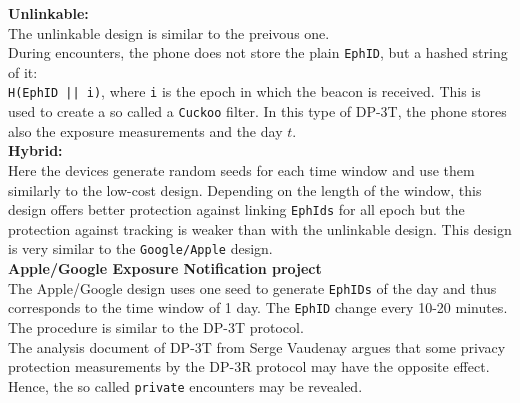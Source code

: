 \documentclass[a4paper, twocolumn]{article}
\begin{document}
\textbf{Unlinkable:}\\
The unlinkable design is similar to the preivous one.\\
During encounters, the phone does not store the plain \texttt{EphID}, but a hashed string of it:\\ \texttt{H(EphID || i)}, where \texttt{i} is the epoch in which the beacon is received. This is used to create a so called a \texttt{Cuckoo} filter. In this type of DP-3T, the phone stores also the exposure measurements and the day $t$.\\
\textbf{Hybrid:}\\
Here the devices generate random seeds for each time window and use them similarly to the low-cost design. Depending on the length of the window, this design offers better protection against linking \texttt{EphIds} for all epoch but the protection against tracking is weaker than with the unlinkable design. This design is very similar to the \texttt{Google/Apple} design.\\

\noindent \textbf{Apple/Google Exposure Notification project}\\
The Apple/Google design \cite{appGoog} uses one seed to generate \texttt{EphIDs} of the day and thus corresponds to the time window of 1 day. The \texttt{EphID} change every 10-20 minutes. The procedure is similar to the DP-3T protocol.\\

\noindent The analysis document of DP-3T from Serge Vaudenay \cite{analyDP3t} argues that some privacy protection measurements by the DP-3R protocol may have the opposite effect. Hence, the so called \texttt{private} encounters may be revealed.
\end{document}
